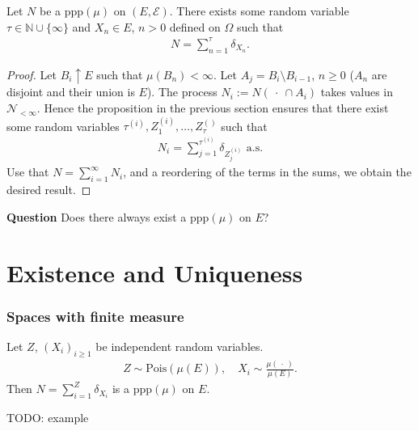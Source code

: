 \begin{theorem}
	Let $N$ be a ppp$(\mu)$ on $(E, \mathcal{E})$. There exists some random variable $\tau \in \mathbb{N}\cup \{\infty\}$ and $X_n \in E$, $n> 0$ defined on $\Omega $ such that
	\begin{align}
		N = \sum_{n=1}^{\tau} \delta_{X_n}.
	\end{align}
\end{theorem}

\begin{proof}
	Let $B_i \uparrow E$ such that $\mu (B_n) < \infty $. Let $A_j = B_i \setminus B_{i-1}$, $n\geq 0$ ($A_n$ are disjoint and their union is  $E$).  The process $N_i := N(\ \cdot \ \cap A_i)$ takes values in $\mathcal{N}_{<\infty }$. Hence the proposition in the previous section ensures that there exist some random variables $\tau^{(i)}, Z_1^{(i)}, \ldots, Z_{\tau}^{()}$ such that
	\begin{align}
		N_i = \sum_{j=1}^{\tau^{(i)}} \delta_{Z_{j}^{(i)}} \textrm{ a.s.}
	\end{align}
Use that $N=\sum_{i=1}^{\infty } N_i$, and a reordering of the terms in the sums, we obtain the desired result.	
\end{proof}


\textbf{Question} Does there always exist a ppp$(\mu)$ on $E$?
\section{Existence and Uniqueness}
\subsubsection{Spaces with finite measure}
\begin{prop}[]
	Let $Z$, $(X_i)_{i\geq 1}$ be independent random variables. 
	\begin{align}
		Z \sim \textrm{Pois}(\mu(E)), \quad X_i \sim \frac{\mu(\ \cdot \ )}{\mu (E)}.	
	\end{align}
	Then $N= \sum_{i=1}^{Z} \delta_{X_i} $ is a ppp$(\mu)$ on $E$.
\end{prop}
{\color{blue}
TODO: example}

